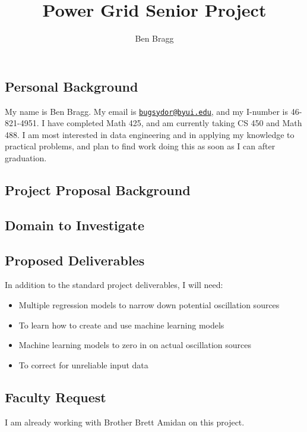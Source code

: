 \documentclass[
]{article}
\title{Power Grid Senior Project}
\author{Ben Bragg}
\date{}
\begin{document}
\maketitle

\hypertarget{personal-background}{%
\subsection{Personal Background}\label{personal-background}}

My name is Ben Bragg. My email is
\href{mailto:bugsydor@byui.edu}{\nolinkurl{bugsydor@byui.edu}}, and my
I-number is 46-821-4951. I have completed Math 425, and am currently
taking CS 450 and Math 488. I am most interested in data engineering and
in applying my knowledge to practical problems, and plan to find work
doing this as soon as I can after graduation.

\hypertarget{project-proposal-background}{%
\subsection{Project Proposal
Background}\label{project-proposal-background}}

\hypertarget{domain-to-investigate}{%
\subsection{Domain to Investigate}\label{domain-to-investigate}}

\hypertarget{proposed-deliverables}{%
\subsection{Proposed Deliverables}\label{proposed-deliverables}}

In addition to the standard project deliverables, I will need:

\begin{itemize}
\item
  Multiple regression models to narrow down potential oscillation
  sources
\item
  To learn how to create and use machine learning models
\item
  Machine learning models to zero in on actual oscillation sources
\item
  To correct for unreliable input data
\end{itemize}

\hypertarget{faculty-request}{%
\subsection{Faculty Request}\label{faculty-request}}

I am already working with Brother Brett Amidan on this project.
\end{document}
